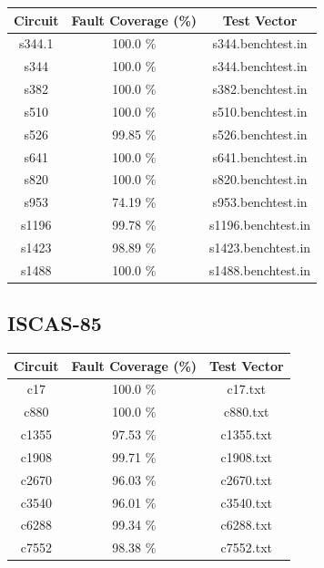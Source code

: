 \documentclass[a4paper,12pt]{article}
\begin{document}
\begin{center}
\begin{tabular}{||c c c||}
\hline
Circuit & Fault Coverage (\%) & Test Vector \\ [0.5ex] 
\hline\hline
s344.1 & 100.0 \%  & s344.benchtest.in \\ 
\hline
s344 & 100.0 \%  & s344.benchtest.in \\ 
\hline
s382 & 100.0 \%  & s382.benchtest.in \\ 
\hline
s510 & 100.0 \%  & s510.benchtest.in \\ 
\hline
s526 & 99.85 \%  & s526.benchtest.in \\ 
\hline
s641 & 100.0 \%  & s641.benchtest.in \\ 
\hline
s820 & 100.0 \%  & s820.benchtest.in \\ 
\hline
s953 & 74.19 \%  & s953.benchtest.in \\ 
\hline
s1196 & 99.78 \%  & s1196.benchtest.in \\ 
\hline
s1423 & 98.89 \%  & s1423.benchtest.in \\ 
\hline
s1488 & 100.0 \%  & s1488.benchtest.in \\ 
\hline
\hline
\end{tabular}
\end{center}

\clearpage
\subsection*{ISCAS-85}

\begin{center}
\begin{tabular}{||c c c||}
\hline
Circuit & Fault Coverage (\%) & Test Vector \\ [0.5ex] 
\hline\hline
c17 & 100.0 \%  & c17.txt \\ 
\hline
c880 & 100.0 \%  & c880.txt \\ 
\hline
c1355 & 97.53 \%  & c1355.txt \\ 
\hline
c1908 & 99.71 \%  & c1908.txt \\ 
\hline
c2670 & 96.03 \%  & c2670.txt \\ 
\hline
c3540 & 96.01 \%  & c3540.txt \\ 
\hline
c6288 & 99.34 \%  & c6288.txt \\ 
\hline
c7552 & 98.38 \%  & c7552.txt \\ 
\hline
\hline
\end{tabular}
\end{center}
\end{document}
